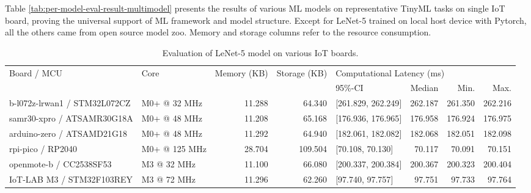 Table \ref{tab:per-model-eval-result-multimodel} presents the results of various ML models on representative TinyML tasks on single IoT board, proving the universal support of ML framework and model structure. Except for LeNet-5 trained on local host device with Pytorch, all the others came from open source model zoo. Memory and storage columns refer to the resource consumption.

\begin{table}[ht]
\centering
\begin{threeparttable}
\caption{Evaluation of LeNet-5 model on various IoT boards.}
\label{tab:per-model-eval-result-multiboard}
\centering
\begin{tabular}{llrrlrrr}
\hline
\multirow{2}{*}{Board   / MCU} & \multirow{2}{*}{Core} & \multirow{2}{*}{Memory (KB)} & \multirow{2}{*}{Storage (KB)} & \multicolumn{4}{l}{Computational Latency   (ms)}    \\ \cline{5-8} 
                               &                       &                              &                               & 95\%-CI               & Median  & Min.    & Max. \\\hline
b-l072z-lrwan1 / STM32L072CZ & M0+ @ 32 MHz          & 11.288                       & 64.340                         & {[}261.829, 262.249{]} & 262.187 & 261.350  & 262.216 \\
samr30-xpro / ATSAMR30G18A & M0+ @ 48 MHz          & 11.208                       & 65.168                        & {[}176.936, 176.965{]} & 176.958 & 176.924 & 176.975 \\
arduino-zero   / ATSAMD21G18        & M0+ @ 48 MHz          & 11.292                       & 64.940                         & {[}182.061, 182.082{]} & 182.068 & 182.051 & 182.098 \\
rpi-pico   / RP2040        & M0+ @ 125 MHz   &   28.704     &    109.504  &  [70.108, 70.130]  &   70.117  &   70.091 & 70.151 \\

openmote-b   / CC2538SF53          & M3 @ 32 MHz           & 11.100                         & 66.080                         & {[}200.337, 200.384{]} & 200.367 & 200.323 & 200.404 \\
IoT-LAB M3 / STM32F103REY    & M3 @ 72 MHz           & 11.296                       & 62.260                         & {[}97.740, 97.757{]}    & 97.751  & 97.733  & 97.764  \\


\end{tabular}
\end{threeparttable}
\end{table}
